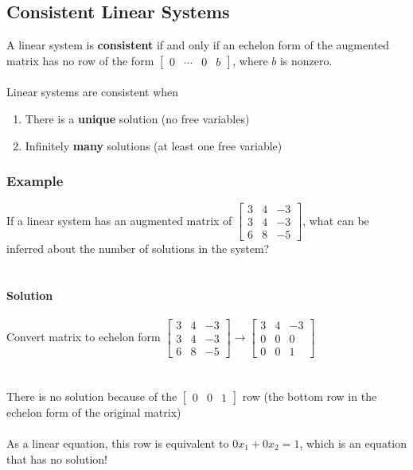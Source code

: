 \subsection{Consistent Linear Systems}
A linear system is \textbf{consistent} if and only if an echelon form of
the augmented matrix has no row of the form $\left[\begin{array}{ccc|c} 0 
& \cdots & 0 & b \end{array}\right]$, where $b$ is nonzero. \\\\
Linear systems are consistent when
\begin{enumerate}
  \item There is a \textbf{unique} solution (no free variables)
  \item Infinitely \textbf{many} solutions (at least one free variable)
\end{enumerate}
\subsubsection{Example}
If a linear system has an augmented matrix of
$\left[\begin{array}{cc|c}
  3 & 4 & -3 \\
  3 & 4 & -3 \\
  6 & 8 & -5
\end{array}\right]$, what can be inferred about the number of solutions in the
system? \\\\\\
\textbf{Solution} \\\\
Convert matrix to echelon form
$\left[\begin{array}{cc|c}
  3 & 4 & -3 \\
  3 & 4 & -3 \\
  6 & 8 & -5
\end{array}\right] \rightarrow
\left[\begin{array}{cc|c}
  3 & 4 & -3 \\
  0 & 0 & 0 \\
  0 & 0 & 1
\end{array}\right]$ \\\\\\
There is no solution because of the $\left[\begin{array}{cc|c}
  0 & 0 & 1
\end{array}\right]$ row (the bottom row in the echelon form of
the original matrix) \\\\
As a linear equation, this row is equivalent to $0x_1 + 0x_2 = 1$, 
which is an equation that has no solution!

